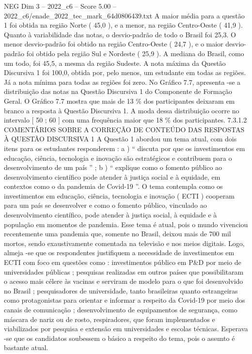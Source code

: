 \begin{textsample}{NEG Dim 3 – 2022\_c6 – Score 5.00 – 2022\_c6/enade\_2022\_tec\_mark\_64d0806439.txt}
A maior média para a questão 1 foi obtida na região Norte ( 45,0 ), e a menor, na região Centro-Oeste ( 41,9 ).
Quanto à variabilidade das notas, o desvio-padrão de todo o Brasil foi 25,3.
O menor desvio-padrão foi obtido na região Centro-Oeste ( 24,7 ), e o maior desvio-padrão foi obtido pela região Sul e Nordeste ( 25,9 ).
A mediana do Brasil, como um todo, foi 45,5, a mesma da região Sudeste.
A nota máxima da Questão Discursiva 1 foi 100,0, obtida por, pelo menos, um estudante em todas as regiões.
Já a nota mínima para todas as regiões foi zero.
No Gráfico 7.7, apresenta -se a distribuição das notas na Questão Discursiva 1 do Componente de Formação Geral.
O Gráfico 7.7 mostra que mais de 13 \% dos participantes deixaram em branco a resposta à Questão Discursiva 1.
A moda dessa distribuição ocorre no intervalo [ 50 ; 60 ] com uma frequência maior que 18 \% dos participantes. 7.3.1.2 COMENTÁRIOS SOBRE A CORREÇÃO DE CONTEÚDO DAS RESPOSTAS À QUESTÃO DISCURSIVA 1 A Questão 1 abordou um tema atual, com dois itens para os estudantes responderem : a ) “ discuta por que os investimentos em educação, ciência, tecnologia e inovação são estratégicos e contribuem para o desenvolvimento de um país ” ; b ) “ explique como o fomento público ao desenvolvimento científico pode atender à justiça social e à equidade, em contextos como o da pandemia de Covid-19 ”.
O tema contempla como os investimentos em educação, ciência, tecnologia e inovação ( ECTI ) cooperam para um país se desenvolver e como o fomento público, vinculado ao desenvolvimento científico, pode atender à justiça social, à equidade e à população em momentos de pandemia.
Esse tema é atual, pois o mundo vivenciou recentemente uma pandemia que, somente no Brasil, deixou mais de 700 mil mortos, sendo exaustivamente comentada na televisão e nos meios digitais.
Logo, almeja -se que os respondentes justifiquem a necessidade de investimentos em ECTI com foco em questões como : investimentos público em P\&D por meio de universidades públicas ; pesquisas realizadas em outros países que possibilitaram o acesso mais célere às vacinas e serviram de modelo para o que foi desenvolvido no Brasil ; pesquisadores de universidade, tanto brasileiras quanto estrangeiras como protagonistas para orientar e informar a respeito da Covid-19 por meio dos canais de comunicação ; desenvolvimento de equipamentos de segurança, como máscara de nariz ou de rosto, respiradores, que foram implementados e viabilizados por pesquisa e extensão em universidades e escolas técnicas.
Esperava -se que os candidatos soubessem o básico a respeito do tema, pois o assunto é bastante atual.

\end{textsample}
